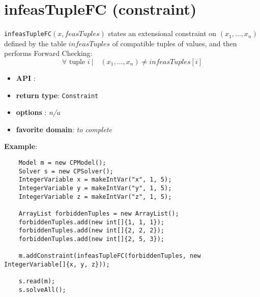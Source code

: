 \label{infeastuplefc}
\hypertarget{infeastuplefc}{}

\section{infeasTupleFC (constraint)}\label{infeastuplefc:infeastuplefcconstraint}\hypertarget{infeastuplefc:infeastuplefcconstraint}{}
\begin{notedef}
  \texttt{infeasTupleFC}$(x,feasTuples)$ states an extensional constraint on $(x_1,\ldots,x_n)$ defined by the table $infeasTuples$ of compatible tuples of values, and then performs Forward Checking:
      $$\forall \text{ tuple } i\ |\quad (x_1,\ldots,x_n)\neq infeasTuples[i]$$
\end{notedef}

\begin{itemize}
	\item \textbf{API} : 
	\item \textbf{return type}: \texttt{Constraint}
	\item \textbf{options} : \emph{n/a}
	\item \textbf{favorite domain}: \emph{to complete}
\end{itemize}

\textbf{Example}:
\begin{lstlisting}
	Model m = new CPModel();
	Solver s = new CPSolver();
	IntegerVariable x = makeIntVar("x", 1, 5);
	IntegerVariable y = makeIntVar("y", 1, 5);
	IntegerVariable z = makeIntVar("z", 1, 5);
	
	ArrayList forbiddenTuples = new ArrayList();
	forbiddenTuples.add(new int[]{1, 1, 1});
	forbiddenTuples.add(new int[]{2, 2, 2});
	forbiddenTuples.add(new int[]{2, 5, 3});
	
	m.addConstraint(infeasTupleFC(forbiddenTuples, new IntegerVariable[]{x, y, z}));
	
	s.read(m);
	s.solveAll();
\end{lstlisting}
